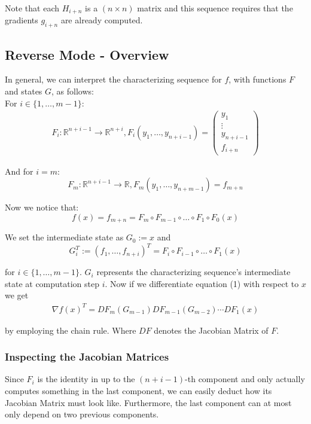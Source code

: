 \documentclass[11pt,a4paper]{article}
\def\R{{\mathbb R}}
\theoremstyle{definition} %
\begin{document}
Note that each $H_{i+n}$ is a $(n \times n)$ matrix and this sequence
requires that the gradients $g_{i+n}$ are already computed.

\subsection{Reverse Mode - Overview}

In general, we can interpret the characterizing sequence
for $f$,
with functions $F$ and states $G$,
as follows:
\\

For $i \in \{
	1, \ldots, m-1
	\} $:
\begin{align*}
	F_i : \R^{n+i - 1} \to \R^{n+i},
	F_i (y_1, \ldots, y_{n+i-1}) =
	\begin{pmatrix}
		y_1       \\
		\vdots    \\
		y_{n+i-1} \\
		f_{i+n}
	\end{pmatrix}
\end{align*}

And for $i=m$:
\[
	F_m : \R^{n+i - 1} \to \R,
	F_m \left(
	y_1, \ldots, y_{n+m-1}
	\right) = f_{m+n}
\]

Now we notice that:
\begin{equation}
	f(x) = f_{m+n}
	=
	F_m \circ
	F_{m-1} \circ \dots \circ
	F_1 \circ
	F_0 (x)
\end{equation}

We set the intermediate state as $G_0 := x$ and
\[
	G_i ^{T} := \left(
	f_1, \ldots, f_{n+i}
	\right)^T
	=
	F_i \circ
	F_{i-1} \circ
	\ldots \circ
	F_1 (x)
\]

for
$i \in \{
	1, \ldots, m-1
	\} $.
$G_i$ represents the characterizing sequence's intermediate state
at computation step $i$.
Now if we differentiate equation (1) with respect to $x$ we get
\begin{align}
	\nabla f(x) ^T =
	DF_m (G_{m-1})
	DF_{m-1} (G_{m-2})
	\cdots
	DF_1 (x)
\end{align}

by employing the chain rule. Where $DF$ denotes the Jacobian
Matrix of $F$.

\subsubsection{Inspecting the Jacobian Matrices}

Since $F_i$ is the identity in up to the $(n+i-1)$-th
component and only actually computes something in the last component,
we can easily deduct how its Jacobian Matrix must look like.
Furthermore, the last component can at most only depend
on two previous components.
\end{document}

